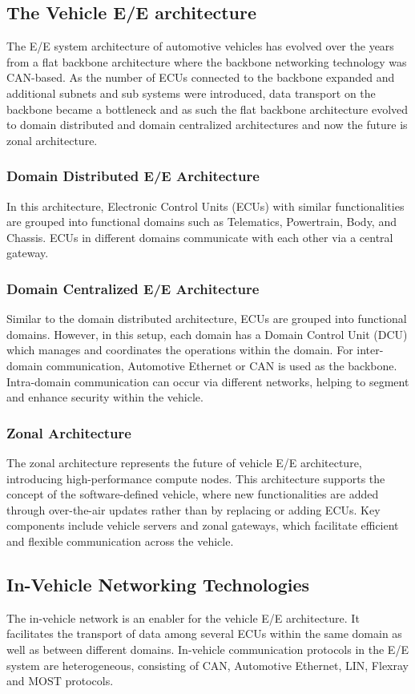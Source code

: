 \documentclass{report}
\begin{document}
\subsection{The Vehicle E/E architecture}
The E/E system architecture of automotive vehicles has evolved over the years from a flat backbone architecture where the backbone networking technology was CAN-based. As the number of ECUs connected to the backbone expanded and additional subnets and sub systems were introduced, data transport on the backbone became a bottleneck and as such the flat backbone architecture evolved to domain distributed and domain centralized architectures and now the future is zonal architecture.

\subsubsection{Domain Distributed E/E Architecture}
In this architecture, Electronic Control Units (ECUs) with similar functionalities are grouped into functional domains such as Telematics, Powertrain, Body, and Chassis. ECUs in different domains communicate with each other via a central gateway.

\subsubsection{Domain Centralized E/E Architecture}
Similar to the domain distributed architecture, ECUs are grouped into functional domains. However, in this setup, each domain has a Domain Control Unit (DCU) which manages and coordinates the operations within the domain. For inter-domain communication, Automotive Ethernet or CAN is used as the backbone. Intra-domain communication can occur via different networks, helping to segment and enhance security within the vehicle.

\subsubsection{Zonal Architecture}
The zonal architecture represents the future of vehicle E/E architecture, introducing high-performance compute nodes. This architecture supports the concept of the software-defined vehicle, where new functionalities are added through over-the-air updates rather than by replacing or adding ECUs. Key components include vehicle servers and zonal gateways, which facilitate efficient and flexible communication across the vehicle.

\subsection{In-Vehicle Networking Technologies}
The in-vehicle network is an enabler for the vehicle E/E architecture. It facilitates the transport of data among several ECUs within the same domain as well as between different domains. In-vehicle communication protocols in the E/E system are heterogeneous, consisting of CAN, Automotive Ethernet, LIN, Flexray and MOST protocols. 
\end{document}
